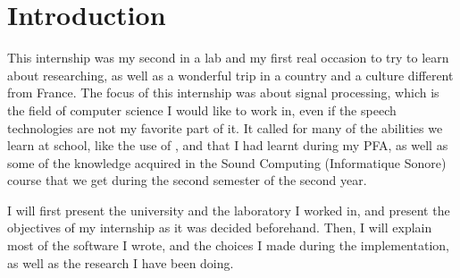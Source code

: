 \section{Introduction}
This internship was my second in a lab and my first real occasion to try to learn about researching, as well as a wonderful trip in a country and a culture different from France.
The focus of this internship was about signal processing, which is the field of computer science I would like to work in, even if the speech technologies are not my favorite part of it. It called for many of the abilities we learn at school, like the use of ,  and  that I had learnt during my \ac{PFA}, as well as some of the knowledge acquired in the Sound Computing (Informatique Sonore) course that we get during the second semester of the second year.

I will first present the university and the laboratory I worked in, and present the objectives of my internship as it was decided beforehand. Then, I will explain most of the software I wrote, and the choices I made during the implementation, as well as the research I have been doing.